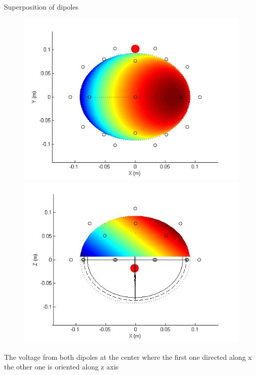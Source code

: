 \documentclass[t,12pt,english
\ifx\beamermode\undefined\else,\beamermode\fi
]{beamer}
\begin{document}
\begin{frame}{Superposition of dipoles}


\begin{figure}[!htbp]
%
\centering
\includegraphics[width=1\textwidth]{9.jpg}
\endminipage\hfill
{}%
\centering
\includegraphics[width=1\textwidth]{10.jpg}
\endminipage\hfill
\end{figure}

\tiny{The voltage from both dipoles at the center where the first one directed along x the other one is oriented along z axis}

\end{frame}
\end{document}
